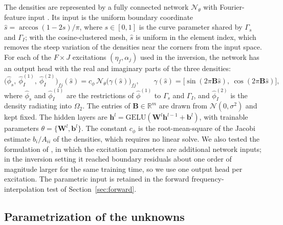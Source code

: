 \documentclass[11pt,twoside]{article}
\begin{document}
The densities are represented by a fully connected network $\mathcal{N}_\theta$ with Fourier-feature input \citep{Tancik2020,wu_novel_2026}. Its input is the uniform boundary coordinate $\hat s = \arccos(1-2s)/\pi$, where $s\in[0,1]$ is the curve parameter shared by $\Gamma_s$ and $\Gamma_I$; with the cosine-clustered mesh, $\hat s$ is uniform in the element index, which removes the steep variation of the densities near the corners from the input space. For each of the $F\times J$ excitations $(\eta_f,\alpha_j)$ used in the inversion, the network has an output head with the real and imaginary parts of the three densities:
\begin{equation*}
  \bigl(\hat\phi_s,\ \hat\phi_I^{(1)},\ \hat\phi_I^{(2)}\bigr)_{fj}(\hat s)
  = c_\phi\,\mathcal{N}_\theta\bigl(\gamma(\hat s)\bigr)_{fj},
  \qquad
  \gamma(\hat s) = \bigl[\sin(2\pi\mathbf{B}\hat s),\ \cos(2\pi\mathbf{B}\hat s)\bigr],
\end{equation*}
where $\hat\phi_s$ and $\hat\phi_I^{(1)}$ are the restrictions of $\hat\phi^{(1)}$ to $\Gamma_s$ and $\Gamma_I$, and $\hat\phi_I^{(2)}$ is the density radiating into $\Omega_2$. The entries of $\mathbf{B}\in\mathbb{R}^{m}$ are drawn from $\mathcal{N}(0,\sigma^2)$ and kept fixed. The hidden layers are $\mathbf{h}^l = \mathrm{GELU}(\mathbf{W}^l\mathbf{h}^{l-1} + \mathbf{b}^l)$, with trainable parameters $\theta = \{\mathbf{W}^l,\mathbf{b}^l\}$. The constant $c_\phi$ is the root-mean-square of the Jacobi estimate $b_i/A_{ii}$ of the densities, which requires no linear solve. We also tested the formulation of \citet{wu_novel_2026}, in which the excitation parameters are additional network inputs; in the inversion setting it reached boundary residuals about one order of magnitude larger for the same training time, so we use one output head per excitation. The parametric input is retained in the forward frequency-interpolation test of Section~\ref{sec:forward}.

\subsection{Parametrization of the unknowns}
\end{document}
